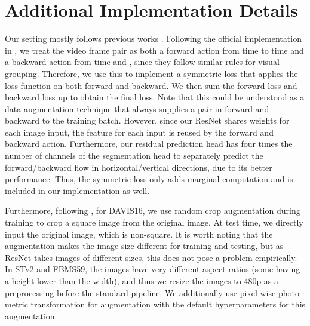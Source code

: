 \section{Additional Implementation Details}


Our setting mostly follows previous works \cite{liu2021emergence,choudhury2022guess}. Following the official implementation in \cite{liu2021emergence}, we treat the video frame pair  as both a forward action from time  to time  and a backward action from time  and , since they follow similar rules for visual grouping. Therefore, we use this to implement a symmetric loss that applies the loss function on both forward and backward. We then sum the forward loss and backward loss up to obtain the final loss. Note that this could be understood as a data augmentation technique that always supplies a pair in forward and backward to the training batch. However, since our ResNet shares weights for each image input, the feature for each input is reused by the forward and backward action. Furthermore, our residual prediction head has four times the number of channels of the segmentation head to separately predict the forward/backward flow in horizontal/vertical directions, due to its better performance. Thus, the symmetric loss only adds marginal computation and is included in our implementation as well.

Furthermore, following \cite{liu2021emergence}, for DAVIS16, we use random crop augmentation during training to crop a square image from the original image. At test time, we directly input the original image, which is non-square. It is worth noting that the augmentation makes the image size different for training and testing, but as ResNet \cite{he2016deep} takes images of different sizes, this does not pose a problem empirically. In STv2 and FBMS59, the images have very different aspect ratios (some having a height lower than the width), and thus we resize the images to 480p as a preprocessing before the standard pipeline. We additionally use pixel-wise photo-metric transformation \cite{mmseg2020} for augmentation with the default hyperparameters for this augmentation.

